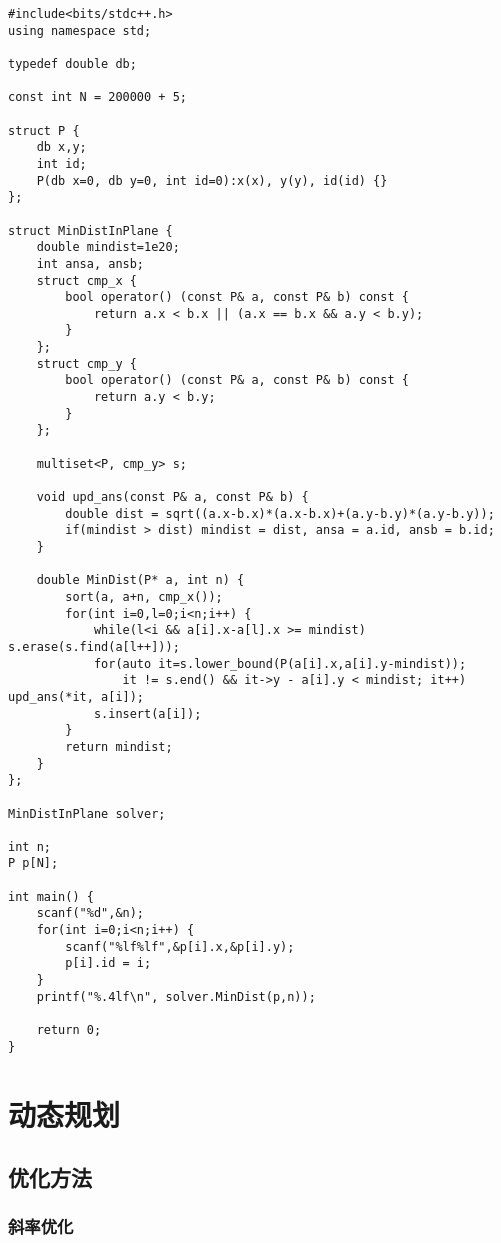 \documentclass[UTF8]{ctexart}
\begin{document}
\begin{framed}
\begin{lstlisting}
#include<bits/stdc++.h>
using namespace std;

typedef double db;

const int N = 200000 + 5;

struct P {
    db x,y;
    int id;
    P(db x=0, db y=0, int id=0):x(x), y(y), id(id) {}
};

struct MinDistInPlane {
    double mindist=1e20;
    int ansa, ansb;
    struct cmp_x {
        bool operator() (const P& a, const P& b) const {
            return a.x < b.x || (a.x == b.x && a.y < b.y);
        }
    };
    struct cmp_y {
        bool operator() (const P& a, const P& b) const {
            return a.y < b.y;
        }
    };

    multiset<P, cmp_y> s;
    
    void upd_ans(const P& a, const P& b) {
        double dist = sqrt((a.x-b.x)*(a.x-b.x)+(a.y-b.y)*(a.y-b.y));
        if(mindist > dist) mindist = dist, ansa = a.id, ansb = b.id;
    }
    
    double MinDist(P* a, int n) {
        sort(a, a+n, cmp_x());
        for(int i=0,l=0;i<n;i++) {
            while(l<i && a[i].x-a[l].x >= mindist) s.erase(s.find(a[l++]));
            for(auto it=s.lower_bound(P(a[i].x,a[i].y-mindist));
                it != s.end() && it->y - a[i].y < mindist; it++) upd_ans(*it, a[i]);
            s.insert(a[i]);
        }
        return mindist;
    }
};

MinDistInPlane solver;

int n;
P p[N];

int main() {
    scanf("%d",&n);
    for(int i=0;i<n;i++) {
        scanf("%lf%lf",&p[i].x,&p[i].y);
        p[i].id = i;
    }
    printf("%.4lf\n", solver.MinDist(p,n));
    
    return 0;
}
\end{lstlisting}
\end{framed}

\newpage
\section{动态规划}

\subsection{优化方法}

\subsubsection{斜率优化}
\end{document}
